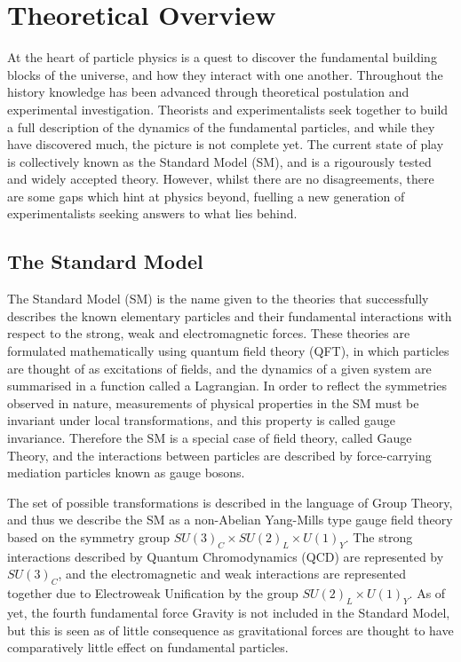 \chapter{Theoretical Overview}

At the heart of particle physics is a quest to discover the fundamental building blocks of the universe, and how they interact with one another. Throughout the history knowledge has been advanced through theoretical postulation and experimental investigation. Theorists and experimentalists seek together to build a full description of the dynamics of the fundamental particles, and while they have discovered much, the picture is not complete yet. The current state of play is collectively known as the Standard Model (SM), and is a rigourously tested and widely accepted theory. However, whilst there are no disagreements, there are some gaps which hint at physics beyond, fuelling a new generation of experimentalists seeking answers to what lies behind. 

\section{The Standard Model}

The Standard Model (SM) is the name given to the theories that successfully describes the known elementary particles and their fundamental interactions with respect to the strong, weak and electromagnetic forces.  These theories are formulated mathematically using quantum field theory (QFT), in which particles are thought of as excitations of fields, and the dynamics of a given system are summarised in a function called a Lagrangian. In order to reflect the symmetries observed in nature, measurements of physical properties in the SM must be invariant under local transformations, and this property is called gauge invariance. Therefore the SM is a special case of field theory, called Gauge Theory, and the interactions between particles are described by force-carrying mediation particles known as gauge bosons. 

The set of possible transformations is described in the language of Group Theory, and thus we describe the SM as a non-Abelian Yang-Mills type gauge field theory based on the symmetry group $SU(3)_{C} \times SU(2)_{L} \times U(1)_{Y}$. The strong interactions described by Quantum Chromodynamics (QCD) are represented by $SU(3)_{C}$, and the electromagnetic and weak interactions are represented together due to Electroweak Unification by the group $SU(2)_L \times U(1)_{Y}$. As of yet, the fourth fundamental force Gravity is not included in the Standard Model, but this is seen as of little consequence as gravitational forces are thought to have comparatively little effect on fundamental particles. 




